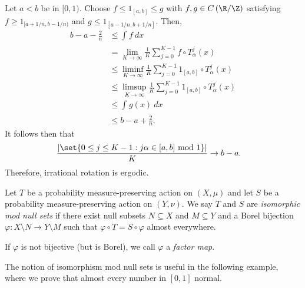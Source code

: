 \documentclass[10pt]{mypackage}
\begin{document}
\begin{example}
  Let $a < b$ be in $[0,1)$. Choose $f\leq 1_{[a,b]}\leq g$ with $f,g\in C\left( \R/\Z \right)$ satisfying $f\geq 1_{[a+1/n,b-1/n)}$ and $g\leq 1_{[a-1/n,b+1/n]}$. Then,
  \begin{align*}
    b-a-\frac{2}{n} &\leq \int_{}^{} f\:dx\\
                    &= \lim_{K\rightarrow\infty} \frac{1}{K}\sum_{j=0}^{K-1} f\circ T^{j}_{\alpha}(x)\\
                    &\leq \liminf_{K\rightarrow\infty} \frac{1}{K}\sum_{j=0}^{K-1} 1_{[a,b]}\circ T^{j}_{\alpha}(x)\\
                    &\leq \limsup_{K\rightarrow\infty} \frac{1}{K}\sum_{j=0}^{K-1} 1_{[a,b]}\circ T^{j}_{\alpha}(x)\\
                    &\leq \int_{}^{} g(x)\:dx\\
                    &\leq b-a + \frac{2}{n}.
  \end{align*}
  It follows then that
  \begin{align*}
    \frac{\left\vert \set{0 \leq j \leq K-1 : j\alpha\in [a,b]\text{ mod }1} \right\vert}{K} &\rightarrow b-a.
  \end{align*}
  Therefore, irrational rotation is ergodic.
\end{example}
\begin{definition}
  Let $T$ be a probability measure-preserving action on $\left( X,\mu \right)$ and let $S$ be a probability measure-preserving action on $\left( Y,\nu \right)$. We say $T$ and $S$ are \textit{isomorphic mod null sets} if there exist null subsets $N\subseteq X$ and $M\subseteq Y$ and a Borel bijection $\varphi\colon X\setminus N\rightarrow Y\setminus M$ such that $\varphi\circ T = S\circ \varphi$ almost everywhere.

  If $\varphi$ is not bijective (but is Borel), we call $\varphi$ a \textit{factor map}.
\end{definition}
The notion of isomorphism mod null sets is useful in the following example, where we prove that almost every number in $[0,1]$ normal.
\end{document}
